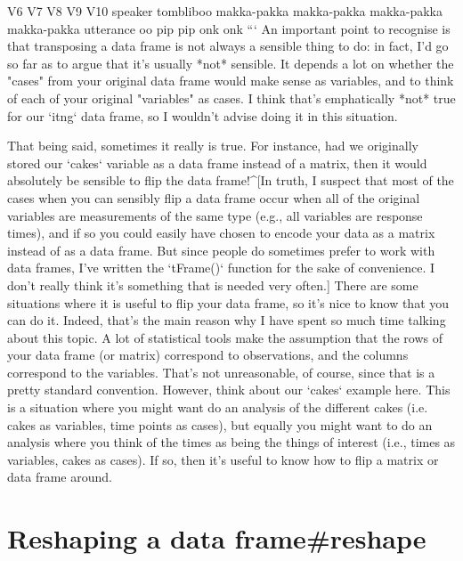                  V6          V7          V8          V9         V10
speaker   tombliboo makka-pakka makka-pakka makka-pakka makka-pakka
utterance        oo         pip         pip         onk         onk
```
An important point to recognise is that transposing a data frame is not always a sensible thing to do: in fact, I'd go so far as to argue that it's usually *not* sensible. It depends a lot on whether the "cases" from your original data frame would make sense as variables, and to think of each of your original "variables" as cases. I think that's emphatically *not* true for our `itng` data frame, so I wouldn't advise doing it in this situation. 

That being said, sometimes it really is true. For instance, had we originally stored our `cakes` variable as a data frame instead of a matrix, then it would absolutely be sensible to flip the data frame!^[In truth, I suspect that most of the cases when you can sensibly flip a data frame occur when all of the original variables are measurements of the same type (e.g., all variables are response times), and if so you could easily have chosen to encode your data as a matrix instead of as a data frame. But since people do sometimes prefer to work with data frames, I've written the `tFrame()` function for the sake of convenience. I don't really think it's something that is needed very often.] There are some situations where it is useful to flip your data frame, so it's nice to know that you can do it. Indeed, that's the main reason why I have spent so much time talking about this topic. A lot of statistical tools make the assumption that the rows of your data frame (or matrix) correspond to observations, and the columns correspond to the variables. That's not unreasonable, of course, since that is a pretty standard convention. However, think about our `cakes` example here. This is a situation where you might want do an analysis of the different cakes (i.e. cakes as variables, time points as cases), but equally you might want to do an analysis where you think of the times as being the things of interest (i.e., times as variables, cakes as cases). If so, then it's useful to know how to flip a matrix or data frame around.





\section{Reshaping a data frame{#reshape}}

